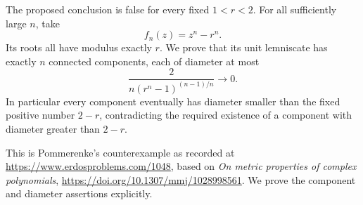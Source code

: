 The proposed conclusion is false for every fixed $1<r<2$. For all sufficiently large $n$, take
\[
 f_n(z)=z^n-r^n.
\]
Its roots all have modulus exactly $r$. We prove that its unit lemniscate has exactly $n$ connected components, each of diameter at most
\[
 \frac{2}{n(r^n-1)^{(n-1)/n}}\longrightarrow0. \tag{1}
\]
In particular every component eventually has diameter smaller than the fixed positive number $2-r$, contradicting the required existence of a component with diameter greater than $2-r$.

This is Pommerenke's counterexample as recorded at \url{https://www.erdosproblems.com/1048}, based on \emph{On metric properties of complex polynomials}, \url{https://doi.org/10.1307/mmj/1028998561}. We prove the component and diameter assertions explicitly.

